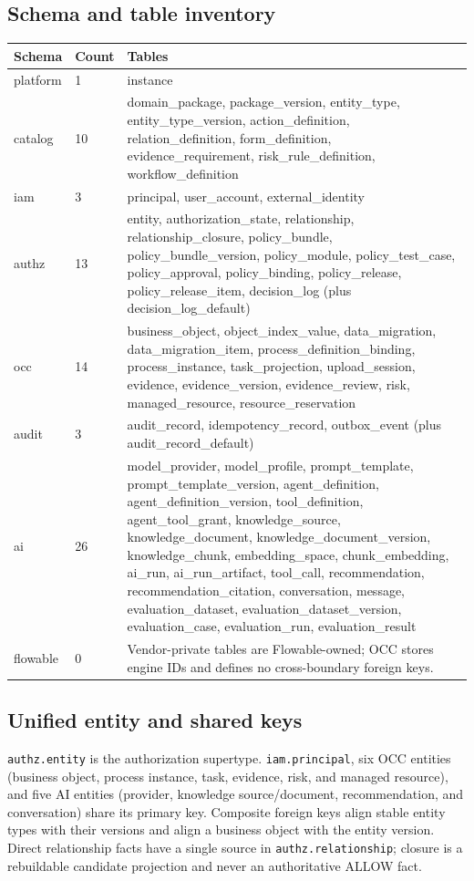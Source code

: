 \documentclass[journal,a4paper,onecolumn]{IEEEtran}
\begin{document}
\subsection{Schema and table inventory}
\begin{longtable}{p{}p{}p{}}
\toprule
Schema & Count & Tables \\
\midrule
\endhead
platform & 1 & instance\\
catalog & 10 & domain\_package, package\_version, entity\_type, entity\_type\_version, action\_definition, relation\_definition, form\_definition, evidence\_requirement, risk\_rule\_definition, workflow\_definition\\
iam & 3 & principal, user\_account, external\_identity\\
authz & 13 & entity, authorization\_state, relationship, relationship\_closure, policy\_bundle, policy\_bundle\_version, policy\_module, policy\_test\_case, policy\_approval, policy\_binding, policy\_release, policy\_release\_item, decision\_log (plus decision\_log\_default)\\
occ & 14 & business\_object, object\_index\_value, data\_migration, data\_migration\_item, process\_definition\_binding, process\_instance, task\_projection, upload\_session, evidence, evidence\_version, evidence\_review, risk, managed\_resource, resource\_reservation\\
audit & 3 & audit\_record, idempotency\_record, outbox\_event (plus audit\_record\_default)\\
ai & 26 & model\_provider, model\_profile, prompt\_template, prompt\_template\_version, agent\_definition, agent\_definition\_version, tool\_definition, agent\_tool\_grant, knowledge\_source, knowledge\_document, knowledge\_document\_version, knowledge\_chunk, embedding\_space, chunk\_embedding, ai\_run, ai\_run\_artifact, tool\_call, recommendation, recommendation\_citation, conversation, message, evaluation\_dataset, evaluation\_dataset\_version, evaluation\_case, evaluation\_run, evaluation\_result\\
flowable & 0 & Vendor-private tables are Flowable-owned; OCC stores engine IDs and defines no cross-boundary foreign keys.\\
\bottomrule
\end{longtable}

\subsection{Unified entity and shared keys}
\texttt{authz.entity} is the authorization supertype. \texttt{iam.principal}, six OCC entities (business object, process instance, task, evidence, risk, and managed resource), and five AI entities (provider, knowledge source/document, recommendation, and conversation) share its primary key. Composite foreign keys align stable entity types with their versions and align a business object with the entity version. Direct relationship facts have a single source in \texttt{authz.relationship}; closure is a rebuildable candidate projection and never an authoritative ALLOW fact.
\end{document}
